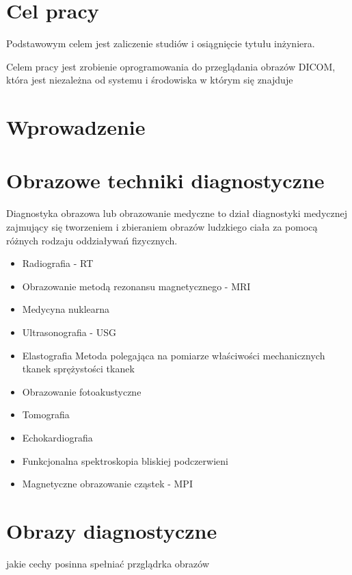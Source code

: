
\section{Cel pracy}

Podstawowym celem jest zaliczenie studiów i osiągnięcie tytułu inżyniera.

Celem pracy jest zrobienie oprogramowania do przeglądania obrazów DICOM, która jest niezależna od systemu i środowiska w którym się znajduje

\section{Wprowadzenie}

\section{Obrazowe techniki diagnostyczne}

Diagnostyka obrazowa lub obrazowanie medyczne to dział diagnostyki medycznej zajmujący się tworzeniem i zbieraniem obrazów ludzkiego ciała za pomocą różnych rodzaju oddziaływań fizycznych.

\begin{itemize}
    \item Radiografia - RT
    \item Obrazowanie metodą rezonansu magnetycznego - MRI
    \item Medycyna nuklearna
    \item Ultrasonografia - USG

    \item Elastografia
    Metoda polegająca na pomiarze właściwości mechanicznych tkanek sprężystości tkanek

    \item Obrazowanie fotoakustyczne
    \item Tomografia
    \item Echokardiografia
    \item Funkcjonalna spektroskopia bliskiej podczerwieni
    \item Magnetyczne obrazowanie cząstek - MPI
\end{itemize}

\section{Obrazy diagnostyczne}

jakie cechy posinna spełniać przglądrka obrazów

